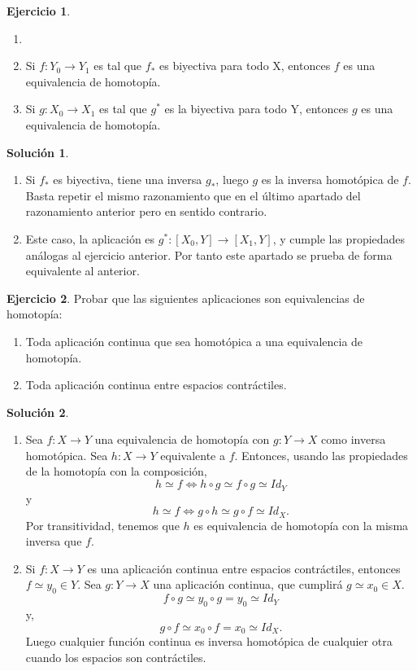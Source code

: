 \documentclass{article}
\theoremstyle{plain}
\theoremstyle{definition}
\newtheorem{exercise}{Ejercicio}
\newtheorem*{sol*}{Solución}
\begin{document}
\newpage
\begin{exercise}
\begin{enumerate}
\item[]
\item Si $f:Y_0\to Y_1$ es tal que $f_*$ es biyectiva para todo X, entonces $f$ es una equivalencia de homotopía.
\item Si $g:X_0\to X_1$ es tal que $g^*$ es la biyectiva para todo Y, entonces $g$ es una equivalencia de homotopía.
\end{enumerate}
\begin{sol*}
\begin{enumerate}\
\item Si $f_*$ es biyectiva, tiene una inversa $g_*$, luego $g$ es la inversa homotópica de $f$. Basta repetir el mismo razonamiento que en el último apartado del razonamiento anterior pero en sentido contrario. 
\item Este caso, la aplicación es $g^*:[X_0,Y]\to [X_1,Y]$, y cumple las propiedades análogas al ejercicio anterior. Por tanto este apartado se prueba de forma equivalente al anterior. 
\end{enumerate}
\end{sol*}

\end{exercise}
\newpage
\begin{exercise}
Probar que las siguientes aplicaciones son equivalencias de homotopía:
\begin{enumerate}
\item Toda aplicación continua que sea homotópica a una equivalencia de homotopía.
\item Toda aplicación continua entre espacios contráctiles.
\end{enumerate}
\end{exercise}
\begin{sol*}
\begin{enumerate}\
\item Sea $f:X\to Y$ una equivalencia de homotopía con $g:Y\to X$ como inversa homotópica. Sea $h:X\to Y$ equivalente a $f$. Entonces, usando las propiedades de la homotopía con la composición, 
\[
h\simeq f\Leftrightarrow h\circ g\simeq f\circ g\simeq Id_Y
\]
y
\[
h\simeq f\Leftrightarrow g\circ h\simeq g\circ f\simeq Id_X.
\]
Por transitividad, tenemos que $h$ es equivalencia de homotopía con la misma inversa que $f$. 
\item Si $f:X\to Y$ es una aplicación continua entre espacios contráctiles, entonces $f\simeq y_0\in Y$. Sea $g:Y\to X$ una aplicación continua, que cumplirá $g\simeq x_0\in X$. 
\[
f\circ g\simeq y_0\circ g = y_0\simeq Id_Y
\]
y,
\[
g\circ f\simeq x_0\circ f =x_0\simeq Id_X.
\]
Luego cualquier función continua es inversa homotópica de cualquier otra cuando los espacios son contráctiles. 
\end{enumerate}
\end{sol*}
\end{document}
